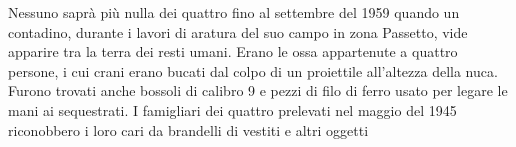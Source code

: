 \noindent Nessuno saprà più nulla dei quattro fino al settembre del 1959 quando un contadino, durante i lavori di aratura del suo campo in zona Passetto, vide apparire tra la terra dei resti umani. Erano le ossa appartenute a quattro persone, i cui crani erano bucati dal colpo di un proiettile all’altezza della nuca. Furono trovati anche bossoli di calibro 9 e pezzi di filo di ferro usato per legare le mani ai sequestrati. I famigliari dei quattro prelevati nel maggio del 1945 riconobbero i loro cari da brandelli di vestiti e altri oggetti
